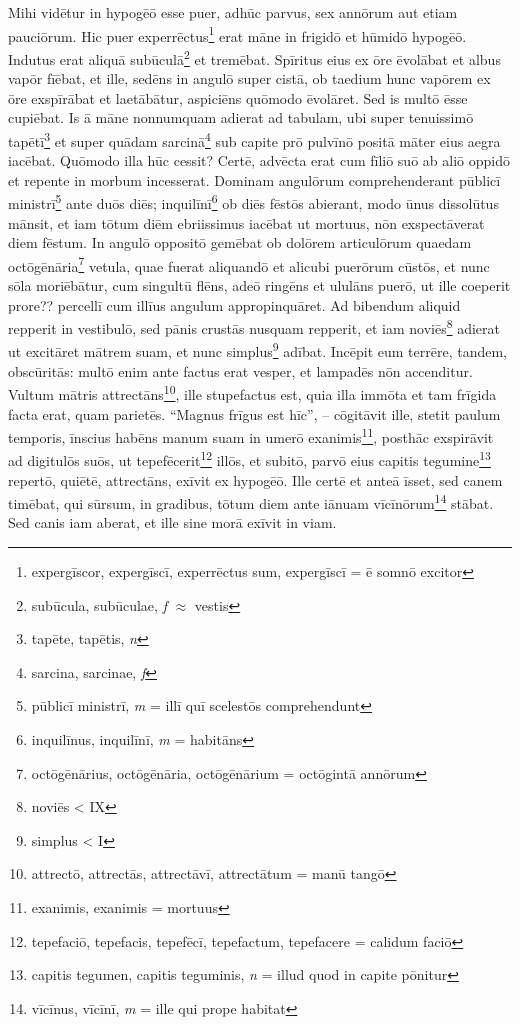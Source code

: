 \documentclass[a4paper, 12pt]{article}
\newcommand{\red}[1]{{\color{red}  {#1}}}
\begin{document}
\begin{linenumbers}
	\red{Mihi vidētur} in hypogēō esse puer, adhūc parvus, sex annōrum aut etiam pauciōrum.
	Hic puer experrēctus\footnote{expergīscor, expergīscī, experrēctus sum, expergīscī = ē somnō excitor} erat māne in frigidō et hūmidō hypogēō.
	Indutus erat aliquā subūculā\footnote{subūcula, subūculae, \textit{f} $\approx$ vestis} et tremēbat.
	Spīritus eius ex ōre ēvolābat et albus vapōr fīēbat, et ille, sedēns in angulō super cistā, ob taedium hunc vapōrem ex ōre exspīrābat et laetābātur, aspiciēns quōmodo ēvolāret.
	Sed is multō ēsse cupiēbat.
	Is ā māne nonnumquam adierat ad tabulam, ubi super tenuissimō tapētī\footnote{tapēte, tapētis, \textit{n}} et super quādam sarcinā\footnote{sarcina, sarcinae, \textit{f}} sub capite prō pulvīnō positā māter eius aegra iacēbat.
	Quōmodo illa hūc cessit?
	Certē, advēcta erat cum fīliō suō ab aliō oppidō et repente in morbum incesserat.
	\red{Dominam angulōrum} comprehenderant pūblicī ministrī\footnote{pūblicī ministrī, \textit{m} = illī quī scelestōs comprehendunt} ante duōs diēs;
	inquilīnī\footnote{inquilīnus, inquilīnī, \textit{m} = habitāns} ob diēs fēstōs abierant, modo ūnus dissolūtus mānsit, et iam tōtum diēm ebriissimus \red{iacēbat} ut mortuus, nōn exspectāverat diem fēstum.
	In angulō oppositō gemēbat ob dolōrem articulōrum quaedam octōgēnāria\footnote{octōgēnārius, octōgēnāria, octōgēnārium = octōgintā annōrum} vetula, quae fuerat aliquandō et alicubi puerōrum cūstōs, et nunc sōla moriēbātur, cum singultū flēns, \red{adeō} ringēns et ululāns puerō, ut ille coeperit \red{prore??} percellī cum illīus angulum appropinquāret.
	Ad bibendum aliquid \red{repperit} in vestibulō, sed pānis crustās nusquam repperit, et iam noviēs\footnote{noviēs < IX} adierat ut excitāret mātrem suam, et nunc simplus\footnote{simplus < I} adībat.
	Incēpit eum terrēre, tandem, obscūritās: multō enim ante factus erat vesper, et lampadēs nōn accenditur.
	Vultum mātris attrectāns\footnote{attrectō, attrectās, attrectāvī, attrectātum = manū tangō}, ille stupefactus est, quia illa immōta et tam frīgida facta erat, quam parietēs.
	``Magnus frīgus est hīc'', -- cōgitāvit ille, stetit paulum temporis, īnscius habēns manum suam in umerō exanimis\footnote{exanimis, exanimis = mortuus}, posthāc exspirāvit ad digitulōs suōs, ut \red{tepefēcerit}\footnote{tepefaciō, tepefacis, tepefēcī, tepefactum, tepefacere = calidum faciō} illōs, et subitō, parvō eius capitis tegumine\footnote{capitis tegumen, capitis teguminis, \textit{n} = illud quod in capite pōnitur} repertō, quiētē, attrectāns, \red{ex}īvit ex hypogēō.
	Ille certē et anteā īsset, sed canem timēbat, qui sūrsum, in gradibus, tōtum diem ante iānuam vīcīnōrum\footnote{vīcīnus, vīcīnī, \textit{m} = ille qui prope habitat} stābat.
	Sed canis iam aberat, et ille sine morā exīvit in viam.
	

\end{linenumbers}
\end{document}
